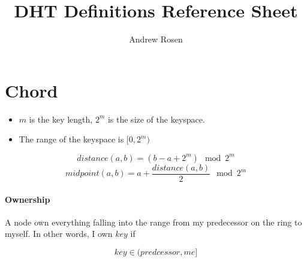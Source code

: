 \documentclass[10pt,a4paper]{article}
\title{DHT Definitions Reference Sheet}
\author{Andrew Rosen }
\begin{document}
\maketitle

\newpage

\section{Chord}

\begin{itemize}
	\item $m$ is the key length, $2^{m}$ is the size of the keyspace.
	\item The range of the keyspace is $ [0, 2^{m}) $
\end{itemize}

$$ distance(a,b) = (b - a + 2^{m}) \mod 2^{m}  $$
$$ midpoint(a,b) =  a + \frac{distance(a,b)}{2} \mod 2^{m}$$

\paragraph{Ownership} A node own everything falling into the range from my predecessor on the ring to myself.
In other words, I own $ key $ if 

$$key \in (predcessor, me]$$
\end{document}
